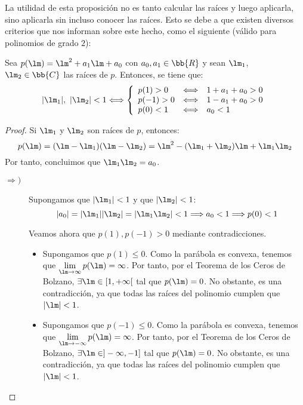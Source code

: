 La utilidad de esta proposición no es tanto calcular las raíces y luego aplicarla, sino aplicarla sin incluso conocer las raíces. Esto se debe a que existen diversos criterios que nos informan sobre este hecho, como el siguiente (válido para polinomios de grado $2$):
\begin{lema}\label{lema:raices_orden2}
    Sea $p(\lm) = \lm^2 + a_1\lm + a_0$ con $a_0, a_1\in \bb{R}$ y sean $\lm_1$, $\lm_2\in \bb{C}$ las raíces de $p$. Entonces, se tiene que:
    \begin{equation}\label{eq:cond_lema_raices}
        |\lm_1|,~|\lm_2| < 1 \Longleftrightarrow \left\{\begin{array}{lcl}
            p(1) > 0 & \Longleftrightarrow & 1 + a_1 + a_0 > 0 \\
            p(-1) > 0 & \Longleftrightarrow  &1-a_1 + a_0 > 0 \\
            p(0) < 1 & \Longleftrightarrow & a_0 < 1 
        \end{array}\right.
    \end{equation}

    \begin{proof}
    Si $\lm_1$ y $\lm_2$ son raíces de $p$, entonces: 
    \begin{equation*}
        p(\lm) = (\lm - \lm_1)(\lm - \lm_2) = \lm^2 - (\lm_1 + \lm_2)\lm + \lm_1\lm_2
    \end{equation*}
    Por tanto, concluimos que $\lm_1\lm_2 = a_0$.
    \begin{description}
        \item[$\Longrightarrow)$] Supongamos que $|\lm_1| < 1$ y que $|\lm_2| < 1$:
        \begin{equation*}
            |a_0| = |\lm_1||\lm_2| = |\lm_1\lm_2| < 1 \Longrightarrow a_0 < 1 \Longrightarrow p(0) < 1
        \end{equation*}

        Veamos ahora que $p(1),p(-1)>0$ mediante contradicciones.
        \begin{itemize}
            \item Supongamos que $p(1) \leq 0$. Como la parábola es convexa, tenemos que $\lim\limits_{\lm\to \infty}p(\lm)=\infty$. Por tanto, por el Teorema de los Ceros de Bolzano, $\exists \lm\in [1,+\infty[$ tal que $p(\lm)=0$. No obstante, es una contradicción, ya que todas las raíces del polinomio cumplen que $|\lm|<1$.
            
            \item Supongamos que $p(-1) \leq 0$. Como la parábola es convexa, tenemos que $\lim\limits_{\lm\to -\infty}p(\lm)=\infty$. Por tanto, por el Teorema de los Ceros de Bolzano, $\exists \lm\in ]-\infty, -1]$ tal que $p(\lm)=0$. No obstante, es una contradicción, ya que todas las raíces del polinomio cumplen que $|\lm|<1$.
        \end{itemize}


\end{description}
\end{proof}
\end{lema}
